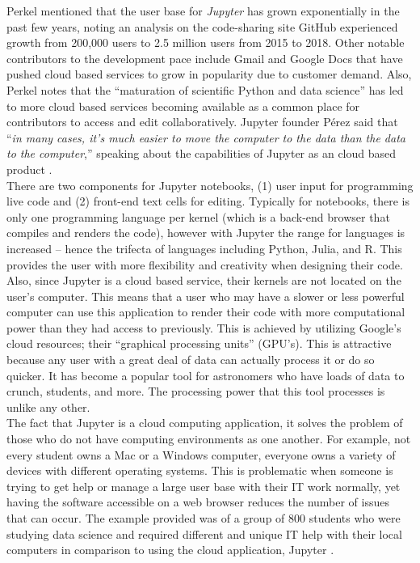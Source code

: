 \documentclass[conference]{IEEEtran}
\begin{document}
Perkel mentioned that the user base for \textit{Jupyter} has grown exponentially in the past few years, noting an analysis on the code-sharing site GitHub experienced growth from 200,000 users to 2.5 million users from 2015 to 2018. Other notable contributors to the development pace include Gmail and Google Docs that have pushed cloud based services to grow in popularity due to customer demand. Also, Perkel notes that the “maturation of scientific Python and data science” has led to more cloud based services becoming available as a common place for contributors to access and edit collaboratively. Jupyter founder Pérez said that “\textit{in many cases, it’s much easier to move the computer to the data than the data to the computer},” speaking about the capabilities of Jupyter as an cloud based product \cite{b1}. \\

There are two components for Jupyter notebooks, (1) user input for programming live code and (2) front-end text cells for editing. Typically for notebooks, there is only one programming language per kernel (which is a back-end browser that compiles and renders the code), however with Jupyter the range for languages is increased -- hence the trifecta of languages including Python, Julia, and R. This provides the user with more flexibility and creativity when designing their code. Also, since Jupyter is a cloud based service, their kernels are not located on the user’s computer. This means that a user who may have a slower or less powerful computer can use this application to render their code with more computational power than they had access to previously. This is achieved by utilizing Google’s cloud resources; their “graphical processing units” (GPU’s)\cite{b1}. This is attractive because any user with a great deal of data can actually process it or do so quicker. It has become a popular tool for astronomers who have loads of data to crunch, students, and more. The processing power that this tool processes is unlike any other.\\

The fact that Jupyter is a cloud computing application, it solves the problem of those who do not have computing environments as one another. For example, not every student owns a Mac or a Windows computer, everyone owns a variety of devices with different operating systems. This is problematic when someone is trying to get help or manage a large user base with their IT work normally, yet having the software accessible on a web browser reduces the number of issues that can occur. The example provided was of a group of 800 students who were studying data science and required different and unique IT help with their local computers in comparison to using the cloud application, Jupyter \cite{b1}.\\
\end{document}
